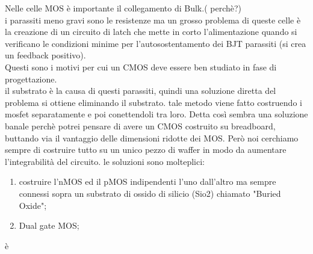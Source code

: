 Nelle celle MOS è importante il collegamento di Bulk.( perchè?)\\
i parassiti meno gravi sono le resistenze ma un grosso problema di queste celle è la creazione di un circuito di latch che mette in corto l'alimentazione quando si verificano le condizioni minime per l'autosostentamento dei BJT parassiti (si crea un feedback positivo).\\
Questi sono i motivi per cui un CMOS deve essere ben studiato in fase di progettazione. \\
il substrato è la causa di questi parassiti, quindi una soluzione diretta del problema si ottiene eliminando il substrato. tale metodo viene fatto costruendo i mosfet separatamente e poi conettendoli tra loro. Detta così sembra una soluzione banale perchè potrei pensare di avere un CMOS costruito su breadboard, buttando via il vantaggio delle dimensioni ridotte dei MOS. Però noi cerchiamo sempre di costruire tutto su un unico pezzo di waffer in modo da aumentare l'integrabilità del circuito.
le soluzioni sono molteplici:
\begin{enumerate}
    \item costruire l'nMOS ed il pMOS indipendenti l'uno dall'altro ma sempre connessi sopra un substrato di ossido di silicio (Sio2) chiamato "Buried Oxide";
    \item Dual gate MOS;
\end{enumerate}è 

